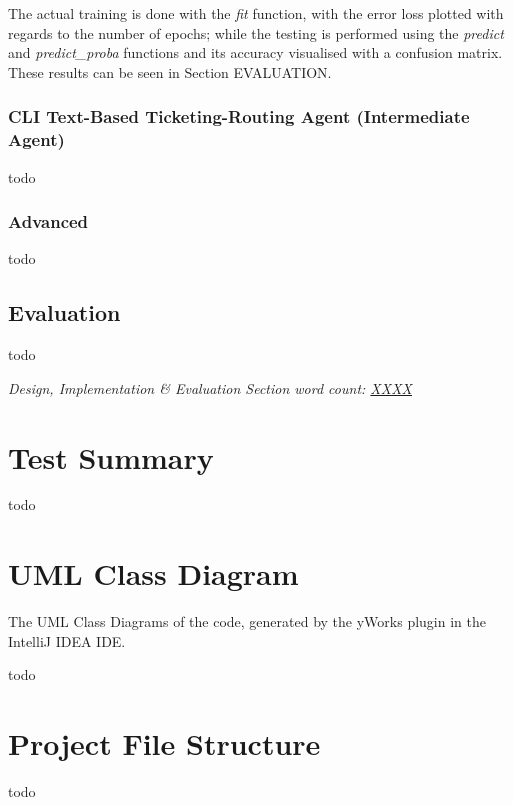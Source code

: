 \documentclass[letterpaper,12pt]{article}
\begin{document}
The actual training is done with the \textit{fit} function, with the error loss plotted with regards to the number of epochs; while the testing is performed using the \textit{predict} and \textit{predict\_proba} functions and its accuracy visualised with a confusion matrix. These results can be seen in Section EVALUATION.


\subsubsection{CLI Text-Based Ticketing-Routing Agent (Intermediate Agent)}

todo


\subsubsection{Advanced}

todo



\subsection{Evaluation}
\label{sec:evaluation}

todo

\textit{Design, Implementation \& Evaluation Section word count: \underline{XXXX}}

\section{Test Summary}
\label{sec:test-summary}

todo


\begin{appendices}

\clearpage




\clearpage
\section{UML Class Diagram}
\label{sec:appendix-uml-class-diagram}

The UML Class Diagrams of the code, generated by the yWorks \cite{yworks} plugin in the IntelliJ IDEA IDE.

todo


\clearpage
\section{Project File Structure}
\label{sec:appendix-project-file-structure}

todo


\end{appendices}
\end{document}
